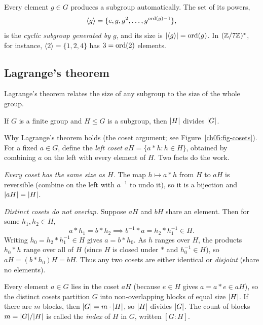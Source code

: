 Every element $g \in G$ produces a subgroup automatically. The set of its powers,
\[
\langle g \rangle = \{e, g, g^2, \dots, g^{\operatorname{ord}(g)-1}\},
\]
is the \emph{cyclic subgroup generated by $g$}, and its size is $\lvert\langle g \rangle\rvert = \operatorname{ord}(g)$. In $(\mathbb{Z}/7\mathbb{Z})^{*}$, for instance, $\langle 2 \rangle = \{1,2,4\}$ has
$3 = \operatorname{ord}(2)$ elements.

\subsection{Lagrange's theorem}

Lagrange's theorem relates the size of any subgroup to the size of the whole group.

\begin{theorem}[Lagrange]
\label{ch05:thm-lagrange}
If $G$ is a finite group and $H \le G$ is a subgroup, then $\lvert H\rvert$ divides $\lvert G\rvert$.
\end{theorem}

\begin{whybox}
Why Lagrange's theorem holds (the coset argument; see Figure~\ref{ch05:fig-cosets}). For a fixed $a \in G$, define the
\emph{left coset} $aH = \{a \ast h : h \in H\}$, obtained by combining $a$ on the left with every element of $H$. Two facts do the work.

\emph{Every coset has the same size as $H$.} The map $h \mapsto a \ast h$ from $H$ to
$aH$ is reversible (combine on the left with $a^{-1}$ to undo it), so it is a bijection and
$\lvert aH\rvert = \lvert H\rvert$.

\emph{Distinct cosets do not overlap.} Suppose $aH$ and $bH$ share an element. Then for some $h_1, h_2 \in H$,
\[
  a \ast h_1 = b \ast h_2
  \implies b^{-1} \ast a = h_2 \ast h_1^{-1} \in H.
\]
Writing $h_0 = h_2 \ast h_1^{-1} \in H$ gives $a = b \ast h_0$. As $h$ ranges over $H$, the products $h_0 \ast h$ range over all of $H$ (since $H$ is closed under $\ast$ and $h_0^{-1} \in H$), so $aH = (b \ast h_0)H = bH$. Thus any
two cosets are either identical or \emph{disjoint} (share no elements).

Every element $a \in G$ lies in the coset $aH$ (because $e \in H$ gives
$a = a\ast e \in aH$), so the distinct cosets partition $G$ into non-overlapping blocks of equal size $\lvert H\rvert$. If there are $m$ blocks, then
$\lvert G\rvert = m\cdot\lvert H\rvert$, so $\lvert H\rvert$ divides $\lvert G\rvert$. The count of blocks $m = \lvert G\rvert/\lvert H\rvert$ is
called the \emph{index} of $H$ in $G$, written $[G:H]$.
\end{whybox}

